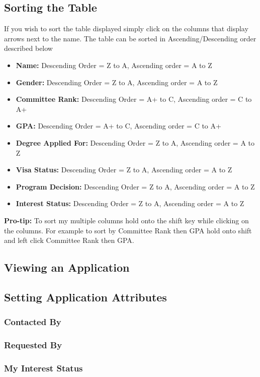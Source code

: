 \documentclass[fontsize=12pt,paper=letter,twoside]{scrartcl}
\begin{document}
\clearpage

\subsection{Sorting the Table}
If you wish to sort the table displayed simply click on the columns that display arrows next to the name. The table can be sorted in Ascending/Descending order described below
\begin{itemize}
\item \textbf{Name:} Descending Order = Z to A, Ascending order = A to Z
\item \textbf{Gender:} Descending Order = Z to A, Ascending order = A to Z
\item \textbf{Committee Rank:} Descending Order = A+ to C, Ascending order = C to A+
\item \textbf{GPA:} Descending Order = A+ to C, Ascending order = C to A+
\item \textbf{Degree Applied For:} Descending Order = Z to A, Ascending order = A to Z
\item \textbf{Visa Status:} Descending Order = Z to A, Ascending order = A to Z
\item \textbf{Program Decision:} Descending Order = Z to A, Ascending order = A to Z
\item \textbf{Interest Status:} Descending Order = Z to A, Ascending order = A to Z
\end{itemize}
\textbf{Pro-tip:} To sort my multiple columns hold onto the shift key while clicking on the columns. For example to sort by Committee Rank then GPA hold onto shift and left click Committee Rank then GPA.
\subsection{Viewing an Application}
\subsection{Setting Application Attributes}
\subsubsection{Contacted By}
\subsubsection{Requested By}
\subsubsection{My Interest Status}
\end{document}

